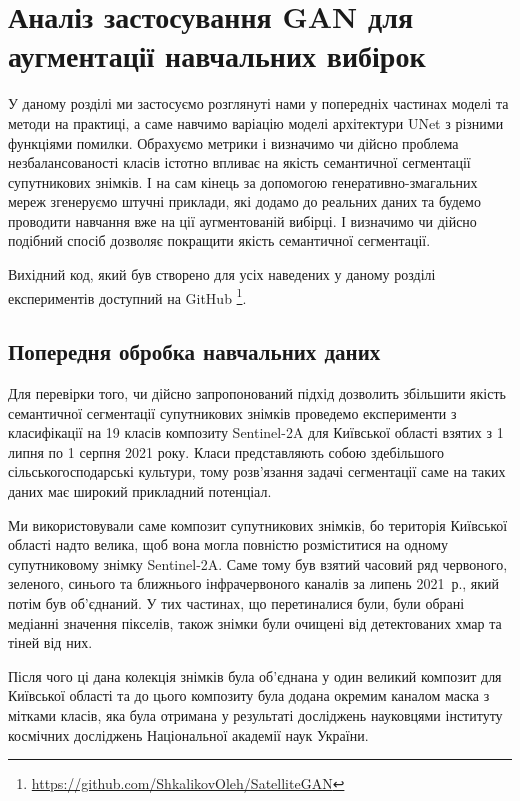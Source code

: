 \chapter{Аналіз застосування GAN для аугментації навчальних вибірок}
\label{chap:practice}

У даному розділі ми застосуємо розглянуті нами у попередніх
частинах моделі та методи на практиці, а саме навчимо варіацію
моделі архітектури UNet з різними функціями помилки. Обрахуємо
метрики і визначимо чи дійсно проблема незбалансованості
класів істотно впливає на якість семантичної сегментації супутникових
знімків. І на сам кінець за допомогою генеративно-змагальних
мереж згенеруємо штучні приклади, які додамо до реальних даних
та будемо проводити навчання вже на ції аугментованій вибірці.
І визначимо чи дійсно подібний спосіб дозволяє
покращити якість семантичної сегментації.

Вихідний код, який був створено для усіх наведених у даному
розділі експериментів доступний на GitHub
\footnote{\href{https://github.com/ShkalikovOleh/SatelliteGAN}
    {https://github.com/ShkalikovOleh/SatelliteGAN}}.

\section{Попередня обробка навчальних даних}

Для перевірки того, чи дійсно запропонований підхід
дозволить збільшити якість семантичної сегментації супутникових знімків
проведемо експерименти з класифікації на 19 класів
композиту Sentinel-2A \cite{drusch2012sentinel}
для Київської області взятих з 1 липня по 1 серпня 2021 року.
Класи представляють собою здебільшого сільськогосподарські
культури, тому розв'язання задачі сегментації саме на таких
даних має широкий прикладний потенціал.

Ми використовували саме композит супутникових знімків, бо
територія Київської області надто велика, щоб вона могла
повністю розміститися на одному супутниковому знімку Sentinel-2A.
Саме тому був взятий часовий ряд червоного, зеленого, синього та
ближнього інфрачервоного каналів за липень 2021~р., який потім був об'єднаний.
У тих частинах, що перетиналися були, були обрані медіанні значення
пікселів, також знімки були очищені від детектованих хмар та тіней від них.

Після чого ці дана колекція знімків була об'єднана у один
великий композит для Київської області та до цього композиту
була додана окремим каналом маска з мітками класів, яка була
отримана у результаті досліджень науковцями інституту
космічних досліджень Національної академії наук України.

